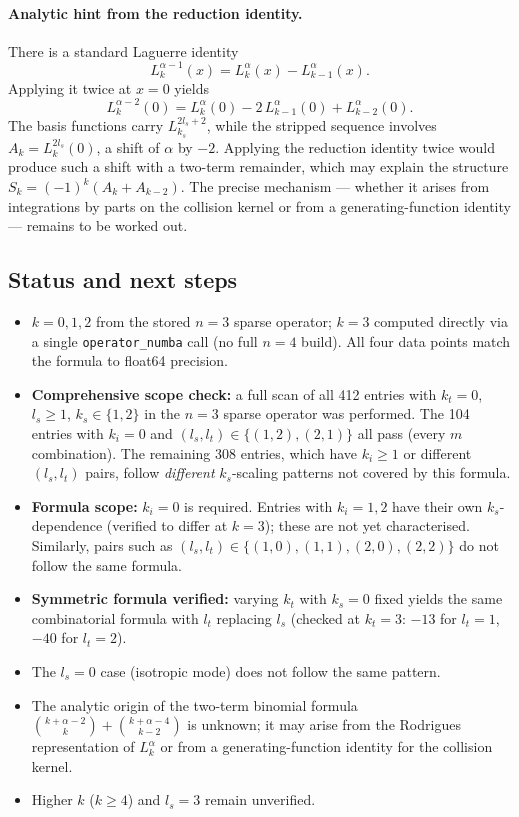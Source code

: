 \documentclass{article}
\begin{document}
\paragraph{Analytic hint from the reduction identity.}
There is a standard Laguerre identity
\[
  L_k^{\alpha-1}(x) = L_k^{\alpha}(x) - L_{k-1}^{\alpha}(x).
\]
Applying it twice at $x=0$ yields
\[
  L_k^{\alpha-2}(0) = L_k^{\alpha}(0) - 2\,L_{k-1}^{\alpha}(0) + L_{k-2}^{\alpha}(0).
\]
The basis functions carry $L_{k_s}^{2l_s+2}$, while the stripped sequence
involves $A_k = L_k^{2l_s}(0)$, a shift of $\alpha$ by $-2$.
Applying the reduction identity twice would produce such a shift with
a two-term remainder, which may explain the structure
$S_k = (-1)^k(A_k + A_{k-2})$.
The precise mechanism — whether it arises from integrations by parts on the
collision kernel or from a generating-function identity — remains to be worked out.

\subsection*{Status and next steps}

\begin{itemize}
  \item $k=0,1,2$ from the stored $n=3$ sparse operator; $k=3$ computed
        directly via a single \texttt{operator\_numba} call (no full $n=4$ build).
        All four data points match the formula to float64 precision.
  \item \textbf{Comprehensive scope check:} a full scan of all 412 entries with
        $k_t=0$, $l_s\geq 1$, $k_s\in\{1,2\}$ in the $n=3$ sparse operator was
        performed.  The 104 entries with $k_i=0$ and
        $(l_s,l_t)\in\{(1,2),(2,1)\}$ all pass (every $m$ combination).
        The remaining 308 entries, which have $k_i\geq 1$ or different
        $(l_s,l_t)$ pairs, follow \emph{different} $k_s$-scaling patterns not
        covered by this formula.
  \item \textbf{Formula scope:} $k_i=0$ is required.  Entries with $k_i=1,2$
        have their own $k_s$-dependence (verified to differ at $k=3$); these
        are not yet characterised.  Similarly, pairs such as
        $(l_s,l_t)\in\{(1,0),(1,1),(2,0),(2,2)\}$ do not follow the same
        formula.
  \item \textbf{Symmetric formula verified:} varying $k_t$ with $k_s=0$ fixed
        yields the same combinatorial formula with $l_t$ replacing $l_s$
        (checked at $k_t=3$: $-13$ for $l_t=1$, $-40$ for $l_t=2$).
  \item The $l_s = 0$ case (isotropic mode) does not follow the same pattern.
  \item The analytic origin of the two-term binomial formula
        $\binom{k+\alpha-2}{k} + \binom{k+\alpha-4}{k-2}$ is unknown;
        it may arise from the Rodrigues representation of $L_k^\alpha$ or
        from a generating-function identity for the collision kernel.
  \item Higher $k$ ($k\geq 4$) and $l_s=3$ remain unverified.
\end{itemize}
\end{document}
